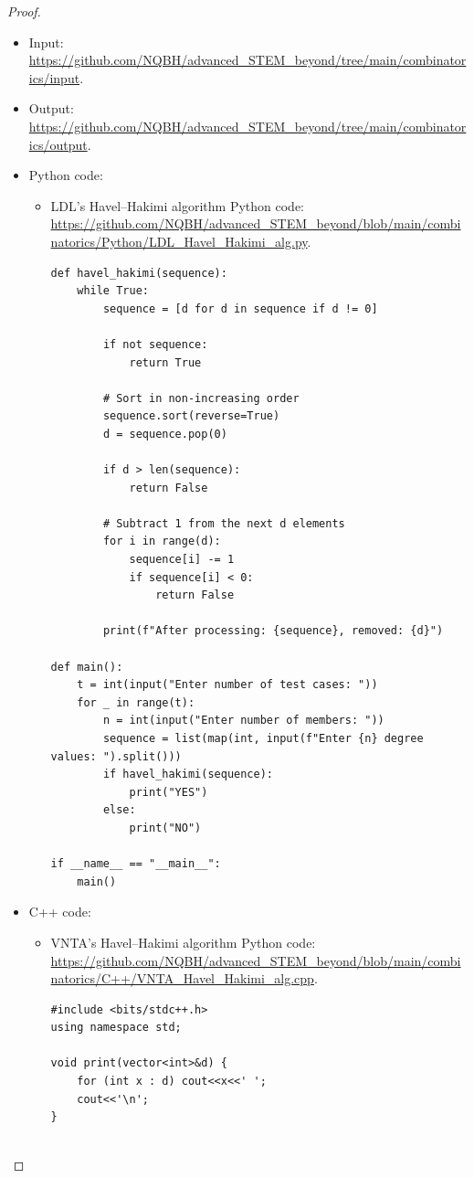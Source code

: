 \documentclass[oneside]{book}
\begin{document}
\begin{proof}
	\begin{itemize}
		\item Input: \url{https://github.com/NQBH/advanced_STEM_beyond/tree/main/combinatorics/input}.
		\item Output: \url{https://github.com/NQBH/advanced_STEM_beyond/tree/main/combinatorics/output}.
		\item Python code:
		\begin{itemize}
			\item LDL's Havel--Hakimi algorithm Python code: \url{https://github.com/NQBH/advanced_STEM_beyond/blob/main/combinatorics/Python/LDL_Havel_Hakimi_alg.py}.
\begin{verbatim}
def havel_hakimi(sequence):
    while True:
        sequence = [d for d in sequence if d != 0]

        if not sequence:
            return True

        # Sort in non-increasing order
        sequence.sort(reverse=True)
        d = sequence.pop(0)

        if d > len(sequence):
            return False

        # Subtract 1 from the next d elements
        for i in range(d):
            sequence[i] -= 1
            if sequence[i] < 0:
                return False

        print(f"After processing: {sequence}, removed: {d}")

def main():
    t = int(input("Enter number of test cases: "))
    for _ in range(t):
        n = int(input("Enter number of members: "))
        sequence = list(map(int, input(f"Enter {n} degree values: ").split()))
        if havel_hakimi(sequence):
            print("YES")
        else:
            print("NO")

if __name__ == "__main__":
    main()
\end{verbatim}
		\end{itemize}
		\item C++ code:
		\begin{itemize}
			\item VNTA's Havel--Hakimi algorithm Python code: \url{https://github.com/NQBH/advanced_STEM_beyond/blob/main/combinatorics/C++/VNTA_Havel_Hakimi_alg.cpp}.
\begin{verbatim}
#include <bits/stdc++.h>
using namespace std;

void print(vector<int>&d) {
    for (int x : d) cout<<x<<' ';
    cout<<'\n';
}


\end{verbatim}
\end{itemize}
\end{itemize}
\end{proof}
\end{document}
